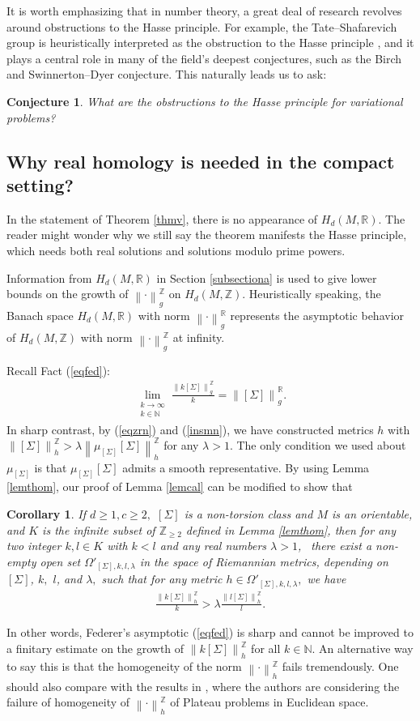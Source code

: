 \documentclass[11pt,a4paper]{amsart}
\numberwithin{equation}{section}
\newcommand{\lam}{\lambda}
\newcommand{\Om}{\Omega}
\newcommand{\Si}{\Sigma}
\newcommand{\no}[1]{\left\lVert#1\right\rVert}
\newcommand{\N}{\mathbb{N}}
\newcommand{\R}{\mathbb{R}}
\newcommand{\Z}{\mathbb{Z}}
\theoremstyle{plain}
\newtheorem{cor}{Corollary}[subsection]
\newtheorem{conj}{Conjecture}
\theoremstyle{definition}
\numberwithin{equation}{subsection}
\begin{document}
	It is worth emphasizing that in number theory, a great deal of research revolves around obstructions to the Hasse principle. For example, the Tate–Shafarevich group is heuristically interpreted as the obstruction to the Hasse principle \cite[Sections 7, 8]{BMlgn}, and it plays a central role in many of the field’s deepest conjectures, such as the Birch and Swinnerton–Dyer conjecture. This naturally leads us to ask:
	\begin{conj}
		What are the obstructions to the Hasse principle for variational problems?
	\end{conj}
	\subsection{Why real homology is needed in the compact setting?}\label{secdrh}
	In the statement of Theorem \ref{thmv}, there is no appearance of $H_d(M,\R).$ The reader might wonder why we still say the theorem manifests the Hasse principle, which needs both real solutions and solutions modulo prime powers. 
	
	Information from $H_d(M,\R)$ in Section \ref{subsectiona} is used to give lower bounds on the growth of $\no{\cdot}_g^{\Z}$ on $H_d(M,\Z).$
	Heuristically speaking, the Banach space $H_d(M,\R)$ with norm $\no{\cdot}_g^{\R}$ represents the asymptotic behavior of $H_d(M,\Z)$ with norm $\no{\cdot}_g^{\Z}$ at infinity. 
	
	Recall Fact (\ref{eqfed}):
	\begin{align*}
		\lim_{\substack{k\to\infty\\ k\in\N}}\frac{\no{k[\Si]}_g^{\Z}}{k}=\no{[\Si]}_g^{\R}.
	\end{align*}In sharp contrast, by (\ref{eqzrn}) and (\ref{insmn}), we have constructed metrics $h$ with $\no{[\Si]}_h^{\Z}>\lam\no{\mu_{[\Si]}[\Si]}_h^{\Z}$ for any $\lam>1.$ The only condition we used about $\mu_{[\Si]}$ is that $\mu_{[\Si]}[\Si]$ admits a smooth representative. By using Lemma \ref{lemthom}, our proof of Lemma \ref{lemcal} can be modified to show that
	\begin{cor}\label{corbad}
		If $d\ge 1,c\ge 2,$ $[\Si]$ is a non-torsion class and $M$ is an orientable, and $K$ is the infinite subset of $\Z_{\ge 2}$ defined in Lemma \ref{lemthom}, then for any two integer $k,l\in K$ with $k<l$ and any real numbers $\lam>1$,  there exist a non-empty open set $\Om'_{[\Si],k,l,\lam}$ in the space of Riemannian metrics, depending on $[\Si]$, $k,$ $l$, and $\lam,$ such that for any metric $h\in \Om'_{[\Si],k,l,\lam},$ we have
		\begin{align}
			\frac{
				\no{k[\Si]}_h^{\Z}}{k}>\lam\frac{\no{l[\Si]}_h^{\Z}}{l}.
		\end{align} 
	\end{cor}
	In other words, Federer's asymptotic (\ref{eqfed}) is sharp and cannot be improved to a finitary estimate on the growth of $\no{k[\Si]}_h^{\Z}$ for all $k\in\N$. An alternative way to say this is that the homogeneity of the norm $\no{\cdot}_h^{\Z}$ fails tremendously. One should also compare with the results in \cite{FMmc,RY,BWmc}, where the authors are considering the failure of homogeneity of $\no{\cdot}_h^{\Z}$ of Plateau problems in Euclidean space. 
	
\end{document}

